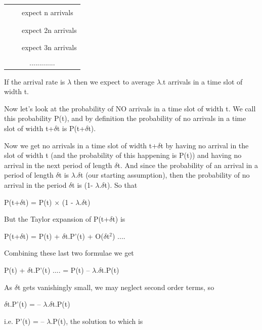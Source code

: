 \documentclass[12pt,fleqn]{report}
\begin{document}
\begin{tabular}{l c l}
\rule{1in}{0.05in} & & expect n arrivals \\
\rule{2in}{0.05in} & & expect 2n arrivals \\
\rule{3in}{0.05in} & & expect 3n arrivals \\
\multicolumn{3}{c}{.............}\\
\end{tabular}

\noindent
If the arrival rate is $\lambda$ then we expect 
to average $\lambda$.t arrivals in a time slot of width t.

Now let's look at the probability of NO arrivals in a time slot 
of width t. We call this probability P(t), and
by definition the probability of no arrivals in a time slot 
of width t+$\delta$t is P(t+$\delta$t).

Now we get no arrivals in a time slot of width 
t+$\delta$t by having no arrival in the slot of width t
(and the probability of this happening is P(t))
and having no arrival in the next period of length $\delta$t.
And since the probability of an arrival in a period of length $\delta$t
is $\lambda$.$\delta$t (our starting assumption), 
then the probability of no arrival
in the period $\delta$t is (1- $\lambda$.$\delta$t).
So that 

\begin{center}
P(t+$\delta$t) = P(t) $\times$ (1 - $\lambda$.$\delta$t)
\end{center}

But the Taylor expansion of P(t+$\delta$t) is

\begin{center}
P(t+$\delta$t)  =  P(t)  +  $\delta$t.P'(t) + {\Large O}($\delta$t$^2$) ....
\end{center}

Combining these last two formulae we get

\begin{center}
P(t)  +  $\delta$t.P'(t) .... =  P(t) -- $\lambda$.$\delta$t.P(t)
\end{center}


As $\delta$t gets vanishingly small, we may neglect second order terms,
so 

\begin{center}
$\delta$t.P'(t) = -- $\lambda$.$\delta$t.P(t)
\end{center}

i.e. P'(t) = -- $\lambda$.P(t), the solution to which is 
\end{document}
